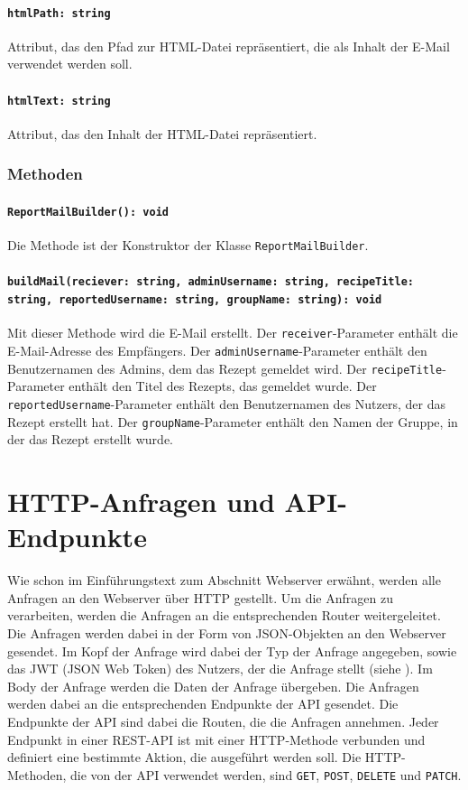 \documentclass{entwurfsheft}
\begin{document}
\paragraph{\texttt{htmlPath: string}}
Attribut, das den Pfad zur HTML-Datei repräsentiert, die als Inhalt der E-Mail verwendet werden soll.
\paragraph{\texttt{htmlText: string}}
Attribut, das den Inhalt der HTML-Datei repräsentiert.
\subsubsection*{Methoden}
\paragraph{\texttt{ReportMailBuilder(): void}}
Die Methode ist der Konstruktor der Klasse \texttt{ReportMailBuilder}.
\paragraph{\texttt{buildMail(reciever: string, adminUsername: string, recipeTitle: string, reportedUsername: string, groupName: string): void}}
Mit dieser Methode wird die E-Mail erstellt. Der \texttt{receiver}-Parameter enthält die E-Mail-Adresse des Empfängers. Der \texttt{adminUsername}-Parameter enthält den Benutzernamen des Admins, dem das Rezept gemeldet wird. Der \texttt{recipeTitle}-Parameter enthält den Titel des Rezepts, das gemeldet wurde. Der \texttt{reportedUsername}-Parameter enthält den Benutzernamen des Nutzers, der das Rezept erstellt hat. Der \texttt{groupName}-Parameter enthält den Namen der Gruppe, in der das Rezept erstellt wurde.

\section{HTTP-Anfragen und API-Endpunkte} \label{sec:HTTP-Anfragen und API-Endpunkte}
Wie schon im Einführungstext zum Abschnitt Webserver erwähnt, werden alle Anfragen an den Webserver über HTTP gestellt.
Um die Anfragen zu verarbeiten, werden die Anfragen an die entsprechenden Router weitergeleitet.
Die Anfragen werden dabei in der Form von JSON-Objekten an den Webserver gesendet.
Im Kopf der Anfrage wird dabei der Typ der Anfrage angegeben, sowie das JWT (JSON Web Token) des Nutzers, der die Anfrage stellt (siehe ).
Im Body der Anfrage werden die Daten der Anfrage übergeben.
Die Anfragen werden dabei an die entsprechenden Endpunkte der API gesendet.
Die Endpunkte der API sind dabei die Routen, die die Anfragen annehmen.
Jeder Endpunkt in einer REST-API ist mit einer HTTP-Methode verbunden und definiert eine bestimmte Aktion, die ausgeführt werden soll.
Die HTTP-Methoden, die von der API verwendet werden, sind \texttt{GET}, \texttt{POST}, \texttt{DELETE} und \texttt{PATCH}.
\end{document}
